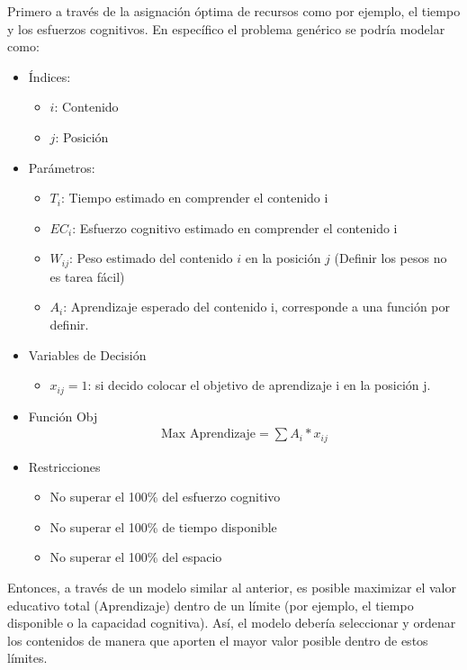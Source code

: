 \documentclass{article}
\begin{document}
Primero a través de la asignación óptima de recursos como por ejemplo, el tiempo y los esfuerzos cognitivos. En específico el problema genérico se podría modelar como: 
\begin{itemize}
    \item Índices: 
    \begin{itemize}
        \item $i$: Contenido
        \item $j$: Posición 
    \end{itemize}
    \item Parámetros: 
    \begin{itemize}
        \item $T_i$: Tiempo estimado en comprender el contenido i  
        \item $EC_i$: Esfuerzo cognitivo estimado en comprender el contenido i
        \item $W_{ij}$: Peso estimado del contenido $i$ en la posición $j$ (Definir los pesos no es tarea fácil) 
        \item $A_i$: Aprendizaje esperado del contenido i, corresponde a una función por definir. 
    \end{itemize}
    \item Variables de Decisión 
    \begin{itemize}
         \item $x_{ij} = 1$: si decido colocar el objetivo de aprendizaje i en la posición j.
    \end{itemize}
       
    \item Función Obj
    \begin{align*}
        \text{Max Aprendizaje}= \sum{A_i*x_{ij}}
    \end{align*}
    \item Restricciones
    \begin{itemize}
        \item No superar el 100\% del esfuerzo cognitivo
        \item No superar el 100\% de tiempo disponible 
        \item No superar el 100\% del espacio
    \end{itemize}
\end{itemize}

Entonces, a través de un modelo similar al anterior, es posible  maximizar el valor educativo total (Aprendizaje) dentro de un límite (por ejemplo, el tiempo disponible o la capacidad cognitiva). Así, el modelo debería seleccionar y ordenar los contenidos de manera que aporten el mayor valor posible dentro de estos límites.
\end{document}
